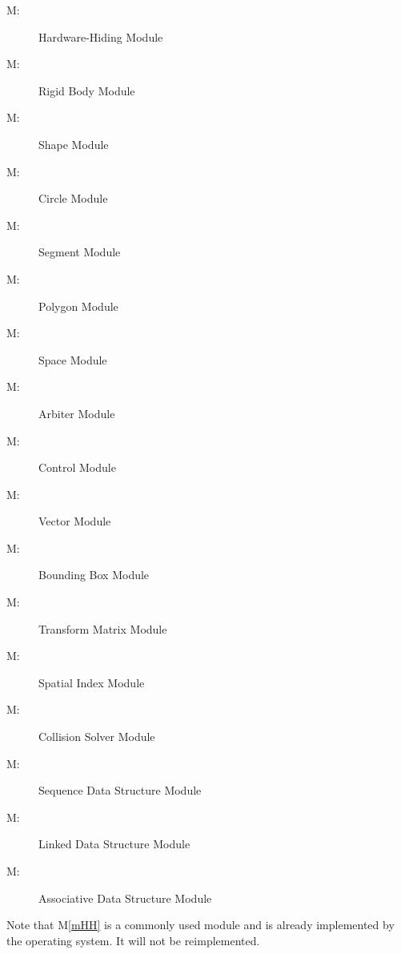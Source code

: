 \documentclass[12pt]{article}
\newcounter{mnum}
\newcommand{\mthemnum}{M\themnum}
\newcommand{\mref}[1]{M\ref{#1}}
\begin{document}
\begin{description}
\item [ \mthemnum \label{mHH}:] Hardware-Hiding Module 
\item [ \mthemnum \label{mBody}:] Rigid Body Module 
\item [ \mthemnum \label{mShape}:] Shape Module 
\item [ \mthemnum \label{mCircle}:] Circle Module
\item [ \mthemnum \label{mSegment}:] Segment Module
\item [ \mthemnum \label{mPoly}:] Polygon Module
\item [ \mthemnum \label{mSpace}:] Space Module 
\item [ \mthemnum \label{mCollision}:] Arbiter Module 
\item [ \mthemnum \label{mControl}:] Control Module 
\item [ \mthemnum \label{mVector}:] Vector Module
\item [ \mthemnum \label{mBBox}:] Bounding Box Module
\item [ \mthemnum \label{mTrans}:] Transform Matrix Module
\item [ \mthemnum \label{mSpatialIndex}:] Spatial Index Module
\item [ \mthemnum \label{mSolver}:] Collision Solver Module 
\item [ \mthemnum \label{mSeqDS}:] Sequence Data Structure Module
\item [ \mthemnum \label{mLinkDS}:] Linked Data Structure Module  
\item [ \mthemnum \label{mAssocDS}:] Associative Data Structure Module 
\end{description}
\noindent
Note that \mref{mHH} is a commonly used module and is already implemented by the operating
system.  It will not be reimplemented.
\end{document}
